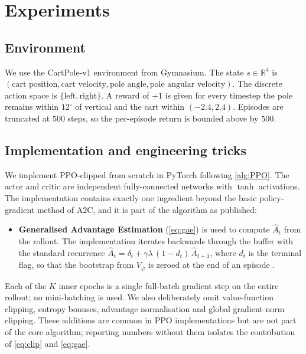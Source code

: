 \documentclass{article}
\theoremstyle{plain}
\theoremstyle{definition}
\theoremstyle{remark}
\begin{document}
\section{Experiments}\label{sec:experiments}

\subsection{Environment}\label{sec:experiments:env}

We use the CartPole-v1 environment from Gymnasium. The state $s\in\mathbb{R}^{4}$ is $(\text{cart position},\text{cart velocity},\text{pole angle},\text{pole angular velocity})$. The discrete action space is $\{\text{left},\text{right}\}$. A reward of $+1$ is given for every timestep the pole remains within $12^{\circ}$ of vertical and the cart within $(-2.4,2.4)$. Episodes are truncated at $500$ steps, so the per-episode return is bounded above by $500$.

\subsection{Implementation and engineering tricks}\label{sec:experiments:impl}

We implement PPO-clipped from scratch in PyTorch following \autoref{alg:PPO}. The actor and critic are independent fully-connected networks with $\tanh$ activations. The implementation contains exactly one ingredient beyond the basic policy-gradient method of A2C, and it is part of the algorithm as published:

\begin{itemize}
    \item \textbf{Generalised Advantage Estimation} (\cref{eq:gae}) is used to compute $\hat A_t$ from the rollout. The implementation iterates backwards through the buffer with the standard recurrence $\hat A_t = \delta_t + \gamma\lambda\,(1-d_t)\,\hat A_{t+1}$, where $d_t$ is the terminal flag, so that the bootstrap from $V_\varphi$ is zeroed at the end of an episode \cite{schulman2016gae}.
\end{itemize}

Each of the $K$ inner epochs is a single full-batch gradient step on the entire rollout; no mini-batching is used. We also deliberately omit value-function clipping, entropy bonuses, advantage normalisation and global gradient-norm clipping. These additions are common in PPO implementations \cite{engstrom2020implementation} but are not part of the core algorithm; reporting numbers without them isolates the contribution of \cref{eq:clip} and \cref{eq:gae}.
\end{document}

